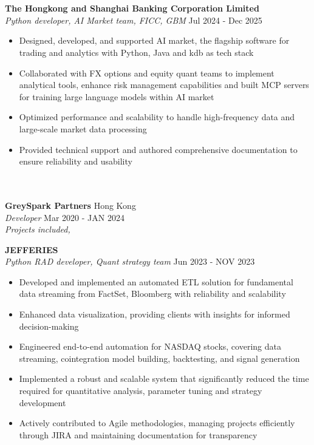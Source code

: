 \documentclass[a4paper]{article}
\newcommand{\lineunder} {
    \vspace*{-8pt} \\
    \hspace*{-18pt} \hrulefill \\
}
\begin{document}
\vspace{1mm}
\lineunder
\vspace{1mm}

\textbf{The Hongkong and Shanghai Banking Corporation Limited} \\
\textit{Python developer, AI Market team, FICC, GBM} \hfill Jul 2024 - Dec 2025\\
\vspace{-1mm}
\begin{itemize} \itemsep 1pt
    \item Designed, developed, and supported AI market, the flagship software for trading and analytics with Python, Java and kdb as tech stack
    \item Collaborated with FX options and equity quant teams to implement analytical tools,  enhance risk management capabilities and built MCP servers for training large language models within AI market
    \item Optimized performance and scalability to handle high-frequency data and large-scale market data processing
    \item Provided technical support and authored comprehensive documentation to ensure reliability and usability
\end{itemize}

\lineunder

\textbf{GreySpark Partners} \hfill Hong Kong\\
\textit{Developer} \hfill Mar 2020 - JAN 2024\\
\textit{Projects included,}

\vspace{+1mm}

\textbf{JEFFERIES} \\
\textit{Python RAD developer, Quant strategy team} \hfill Jun 2023 - NOV 2023\\
\vspace{-1mm}
\begin{itemize} \itemsep 1pt
    \item Developed and implemented an automated ETL solution for fundamental data streaming from FactSet, Bloomberg with reliability and scalability
    \item Enhanced data visualization, providing clients with insights for informed decision-making
    \item Engineered end-to-end automation for NASDAQ stocks, covering data streaming, cointegration model building, backtesting, and signal generation
    \item Implemented a robust and scalable system that significantly reduced the time required for quantitative analysis, parameter tuning and strategy development
    \item Actively contributed to Agile methodologies, managing projects efficiently through JIRA and maintaining documentation for transparency
\end{itemize}
\end{document}
